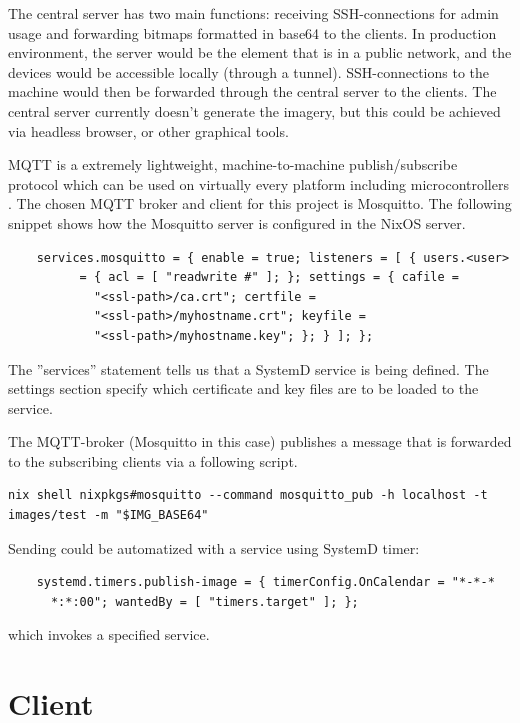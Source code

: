 The central server has two main functions: receiving SSH-connections
for admin usage and forwarding bitmaps formatted in base64 to the
clients. In production environment, the server would be the element
that is in a public network, and the devices would be accessible
locally (through a tunnel). SSH-connections to the machine would then
be forwarded through the central server to the clients. The central
server currently doesn't generate the imagery, but this could be
achieved via headless browser, or other graphical tools.

MQTT is a extremely lightweight, machine-to-machine publish/subscribe
protocol which can be used on virtually every platform including
microcontrollers \cite{oasisopenMQTTVersion}. The chosen MQTT broker
and client for this project is Mosquitto. The following snippet shows
how the Mosquitto server is configured in the NixOS server.

\begin{lstlisting}
    services.mosquitto = { enable = true; listeners = [ { users.<user>
          = { acl = [ "readwrite #" ]; }; settings = { cafile =
            "<ssl-path>/ca.crt"; certfile =
            "<ssl-path>/myhostname.crt"; keyfile =
            "<ssl-path>/myhostname.key"; }; } ]; };
\end{lstlisting}

The ''services'' statement tells us that a SystemD service is being
defined. The settings section specify which certificate and key files
are to be loaded to the service.

The MQTT-broker (Mosquitto in this case) publishes a message that is
forwarded to the subscribing clients via a following script.

\begin{lstlisting}
nix shell nixpkgs#mosquitto --command mosquitto_pub -h localhost -t
images/test -m "$IMG_BASE64"
\end{lstlisting}

Sending could be automatized with a service using SystemD timer:
\begin{lstlisting}
    systemd.timers.publish-image = { timerConfig.OnCalendar = "*-*-*
      *:*:00"; wantedBy = [ "timers.target" ]; };
\end{lstlisting}

which invokes a specified service.

\section{Client}

